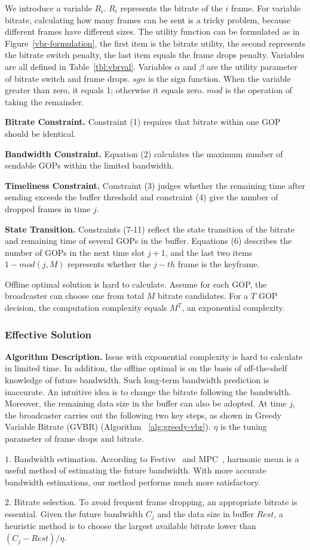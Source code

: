 We introduce a variable $R_{i}$. $R_{i}$ represents the bitrate of the $i$ frame. For variable bitrate, calculating how many frames can be sent is a tricky problem, because different frames have different sizes.
The utility function can be formulated as in Figure~\ref{vbr-formulation},
the first item is the bitrate utility, the second represents the bitrate switch penalty, the last item equals the frame drops penalty. Variables are all defined in Table~\ref{tbl:vbrval}. Variables $\alpha$ and $\beta$ are the utility parameter of bitrate switch and frame drops. $sgn$ is the sign function. When the variable greater than zero, it equals 1; otherwise it equals zero. $mod$ is the operation of taking the remainder.

\textbf{Bitrate Constraint.} Constraint (1) requires that bitrate within one GOP should be identical.

\textbf{Bandwidth Constraint.} Equation (2) calculates the maximum number of sendable GOPs within the limited bandwidth.

\textbf{Timeliness Constraint.} Constraint (3) judges whether the remaining time after sending exceeds the buffer threshold and constraint (4) give the number of dropped frames in time $j$.

\textbf{State Transition.} Constraints (7-11) reflect the state transition of the bitrate and remaining time of several GOPs in the buffer. Equations (6) describes the number of GOPs in the next time slot $j+1$, and the last two items $1-mod(j,M)$ represents whether the $j-th$ frame is the keyframe.

Offline optimal solution is hard to calculate. Assume for each GOP, the broadcaster can choose one from total $M$ bitrate candidates. For a $T$ GOP decision, the computation complexity equals $M^T$, an exponential complexity.

\subsubsection{Effective Solution}

\textbf{Algorithm Description.} Issue with exponential complexity is hard to calculate in limited time. In addition, the offline optimal is on the basis of off-the-shelf knowledge of future bandwidth. Such long-term bandwidth prediction is inaccurate. An intuitive idea is to change the bitrate following the bandwidth. Moreover, the remaining data size in the buffer can also be adopted. At time $j$, the broadcaster carries out the following two key steps, as shown in Greedy Variable Bitrate (GVBR) (Algorithm ~\ref{alg:greedy-vbr}). $\eta$ is the tuning parameter of frame drops and bitrate.

$1.$ Bandwidth estimation. According to Festive~\cite{jiang2014improving} and MPC~\cite{yin2015control}, harmonic mean is a useful method of estimating the future bandwidth. With more accurate bandwidth estimations, our method performs much more satisfactory.

$2.$ Bitrate selection. To avoid frequent frame dropping, an appropriate bitrate is essential. Given the future bandwidth $C_j$ and the data size in buffer $Rest$, a heuristic method is to choose the largest available bitrate lower than $(C_j-Rest)/\eta$.
